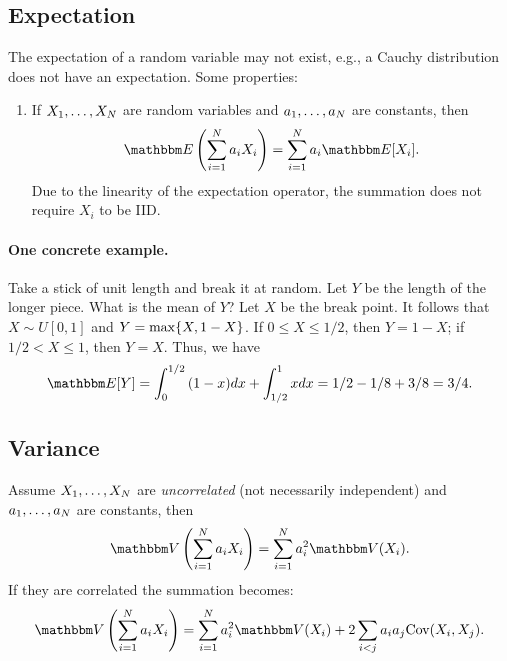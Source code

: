 \subsection{Expectation}
    The expectation of a random variable may not exist, e.g., a Cauchy distribution does not have an expectation. 
    Some properties:
        \begin{enumerate}
            \item If $X_1, \ldots, X_N$ are random variables and $a_1, \ldots, a_N$ are constants, then
                \begin{equation}
                    \E\left( \sum_{i=1}^{\ndata}{a_i X_i}\right) = \sum_{i=1}^{\ndata}{a_i \E[X_i]}.
                \end{equation}
            Due to the linearity of the expectation operator, the summation does not require $X_i$ to be IID.
        \end{enumerate}
    \paragraph{One concrete example.} Take a stick of unit length and break it at random.
    Let $Y$ be the length of the longer piece. 
    What is the mean of $Y$?
    Let $X$ be the break point.
    It follows that $X \sim U[0, 1]$ and $Y = \max\{ X, 1- X \}$.
    If $0 \le X \le 1/2$, then $Y = 1 - X$; if $1/2 < X \le 1$, then $Y = X$.
    Thus, we have
        \begin{equation}
            \E{[Y]} = \int_{0}^{1/2}{(1-x) dx} + \int_{1/2}^{1}{x dx} = 1/2 - 1/8 + 3/8 = 3/4.
        \end{equation}
        
\subsection{Variance}
    Assume $X_1, \ldots, X_N$ are \emph{uncorrelated} (not necessarily independent) and $a_1, \ldots, a_N$ are constants, then
        \begin{equation}
            \Var\left( \sum_{i=1}^{\ndata}{a_i X_i} \right) = \sum_{i=1}^{\ndata}{a_i^2 \Var(X_i)}.
        \end{equation}
    If they are correlated the summation becomes:
        \begin{equation}
            \Var\left( \sum_{i=1}^{\ndata}{a_i X_i}\right) = \sum_{i=1}^{\ndata}{a_i^2 \Var(X_i)} + 2 \sum_{i < j}^{}{a_i a_j \Cov(X_i, X_j)}.
        \end{equation}

